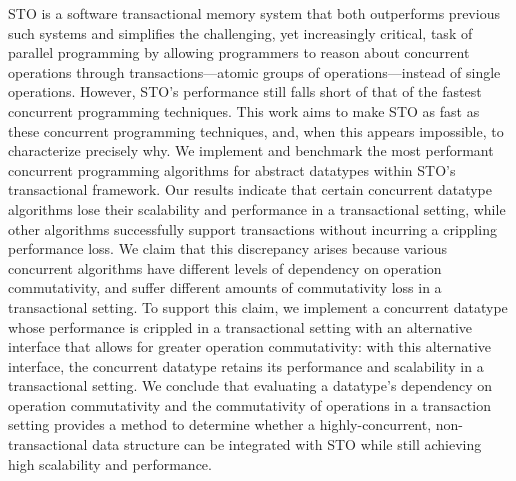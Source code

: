 STO is a software transactional memory system that both outperforms previous such systems and simplifies the challenging, yet increasingly critical, task of parallel programming by allowing programmers to reason about concurrent operations through transactions---atomic groups of operations---instead of single operations.  
However, STO's performance still falls short of that of the fastest concurrent programming techniques. This work aims to make STO as fast as these concurrent programming techniques, and, when this appears impossible, to characterize precisely why. 
We implement and benchmark the most performant concurrent programming algorithms for abstract datatypes within STO's transactional framework. Our results indicate that certain concurrent datatype algorithms lose their scalability and performance in a transactional setting, while other algorithms successfully support transactions without incurring a crippling performance loss. We claim that this discrepancy arises because various concurrent algorithms have different levels of dependency on operation commutativity, and suffer different amounts of commutativity loss in a transactional setting. To support this claim, we implement a concurrent datatype whose performance is crippled in a transactional setting with an alternative interface that allows for greater operation commutativity: with this alternative interface, the concurrent datatype retains its performance and scalability in a transactional setting.
We conclude that evaluating a datatype's dependency on operation commutativity and the commutativity of operations in a transaction setting provides a method to determine whether a highly-concurrent, non-transactional data structure can be integrated with STO while still achieving high scalability and performance.

